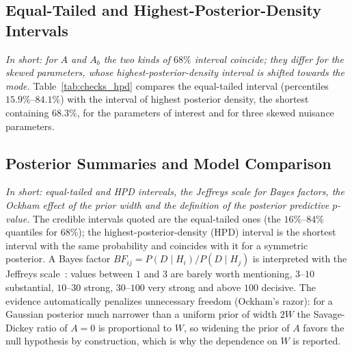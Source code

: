 \subsection{Equal-Tailed and Highest-Posterior-Density Intervals}
\label{sec:checks_hpd}
\emph{In short: for $A$ and $A_b$ the two kinds of $68\%$ interval coincide; they differ for the skewed parameters, whose highest-posterior-density interval is shifted towards the mode.}
Table~\ref{tab:checks_hpd} compares the equal-tailed interval (percentiles $15.9\%$--$84.1\%$) with the interval of highest posterior density, the shortest containing $68.3\%$, for the parameters of interest and for three skewed nuisance parameters.

\begin{table}[h]
\centering
{}
\caption{Equal-tailed and highest-posterior-density $68\%$ intervals and skewness of the marginal posteriors.}
\label{tab:checks_hpd}
\end{table}

\subsection{Posterior Summaries and Model Comparison}
\emph{In short: equal-tailed and HPD intervals, the Jeffreys scale for Bayes factors, the Ockham effect of the prior width and the definition of the posterior predictive $p$-value.}
The credible intervals quoted are the equal-tailed ones (the $16\%$--$84\%$ quantiles for $68\%$); the highest-posterior-density (HPD) interval is the shortest interval with the same probability and coincides with it for a symmetric posterior. A Bayes factor $BF_{ij}=P(D\mid H_i)/P(D\mid H_j)$ is interpreted with the Jeffreys scale~\cite{jeffreys,kass_raftery}: values between $1$ and $3$ are barely worth mentioning, $3$--$10$ substantial, $10$--$30$ strong, $30$--$100$ very strong and above $100$ decisive. The evidence automatically penalizes unnecessary freedom (Ockham's razor): for a Gaussian posterior much narrower than a uniform prior of width $2W$ the Savage-Dickey ratio of $A=0$ is proportional to $W$, so widening the prior of $A$ favors the null hypothesis by construction, which is why the dependence on $W$ is reported.

